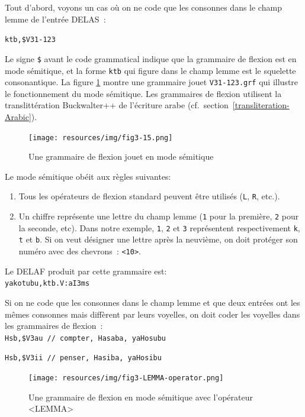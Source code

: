 \bigskip
\noindent Tout d'abord, voyons un cas où on ne code que les consonnes dans le champ lemme de l'entrée DELAS~:

\bigskip
\noindent \verb+ktb,$V31-123+

\bigskip
\noindent Le signe \verb+$+ avant le code grammatical indique que la grammaire de flexion est en mode sémitique, et
la forme \verb+ktb+ qui figure dans le champ lemme est le squelette consonantique. La figure \ref{semitic-grammar}
montre une grammaire jouet \verb+V31-123.grf+ qui illustre le fonctionnement du mode sémitique. Les grammaires
de flexion utilisent la translittération Buckwalter++ de l'écriture arabe (cf.~section~\ref{transliteration-Arabic}).

\bigskip
\begin{figure}[!ht]
\begin{center}
\texttt{[image: resources/img/fig3-15.png]}
\caption{Une grammaire de flexion jouet en mode sémitique\label{semitic-grammar}}
\end{center}
\end{figure}

\noindent Le mode sémitique obéit aux règles suivantes:
\begin{enumerate}
\item Tous les opérateurs de flexion standard peuvent être utilisés (\verb+L+, \verb+R+, etc.).
\item Un chiffre représente une lettre du champ lemme (\verb+1+ pour la première,
\verb+2+ pour la seconde, etc). Dans notre exemple, \verb+1+, \verb+2+ et \verb+3+ représentent
respectivement \verb+k+, \verb+t+ et \verb+b+. Si on veut désigner une lettre après la neuvième,
on doit protéger son numéro avec des chevrons~: \verb+<10>+.
\end{enumerate}  

\noindent Le DELAF produit par cette grammaire est:\\ 
  
\verb+yakotubu,ktb.V:aI3ms+

\bigskip
\noindent Si on ne code que les consonnes dans le champ lemme et que deux entrées ont les mêmes
consonnes mais diffèrent par leurs voyelles, on doit coder les voyelles dans les grammaires de flexion~:\\ 

\verb+Hsb,$V3au	// compter, Hasaba, yaHosubu+

\verb+Hsb,$V3ii	// penser, Hasiba, yaHosibu+

\begin{figure}[!ht]
\begin{center}
\texttt{[image: resources/img/fig3-LEMMA-operator.png]}
\caption{Une grammaire de flexion en mode sémitique avec l'opérateur <LEMMA>\label{LEMMA-operator}}
\end{center}
\end{figure}

